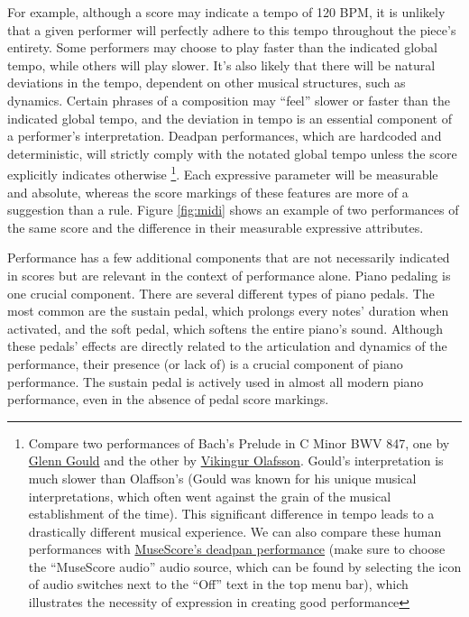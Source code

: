 For example, although a score may indicate a tempo of 120 BPM, it is unlikely that a given performer will perfectly adhere to this tempo throughout the piece's entirety. Some performers may choose to play faster than the indicated global tempo, while others will play slower. It's also likely that there will be natural deviations in the tempo, dependent on other musical structures, such as dynamics. Certain phrases of a composition may ``feel'' slower or faster than the indicated global tempo, and the deviation in tempo is an essential component of a performer's interpretation. Deadpan performances, which are hardcoded and deterministic, will strictly comply with the notated global tempo unless the score explicitly indicates otherwise%
\footnote{Compare two performances of Bach's Prelude in C Minor BWV 847, one by \href{https://www.youtube.com/watch?v=\_3MVZfLReo0}{Glenn Gould} and the other by \href{https://www.youtube.com/watch?v=CGVL5j6BEKs}{Vikingur Olafsson}. Gould's interpretation is much slower than Olaffson's (Gould was known for his unique musical interpretations, which often went against the grain of the musical establishment of the time). This significant difference in tempo leads to a drastically different musical experience. We can also compare these human performances with \href{https://musescore.com/user/30732005/scores/6062802}{MuseScore's deadpan performance} (make sure to choose the ``MuseScore audio'' audio source, which can be found by selecting the icon of audio switches next to the ``Off'' text in the top menu bar), which illustrates the necessity of expression in creating good performance}. Each expressive parameter will be measurable and absolute, whereas the score markings of these features are more of a suggestion than a rule. Figure \ref{fig:midi} shows an example of two performances of the same score and the difference in their measurable expressive attributes. 

Performance has a few additional components that are not necessarily indicated in scores but are relevant in the context of performance alone. Piano pedaling is one crucial component. There are several different types of piano pedals. The most common are the sustain pedal, which prolongs every notes' duration when activated, and the soft pedal, which softens the entire piano's sound. Although these pedals' effects are directly related to the articulation and dynamics of the performance, their presence (or lack of) is a crucial component of piano performance. The sustain pedal is actively used in almost all modern piano performance, even in the absence of pedal score markings. 


